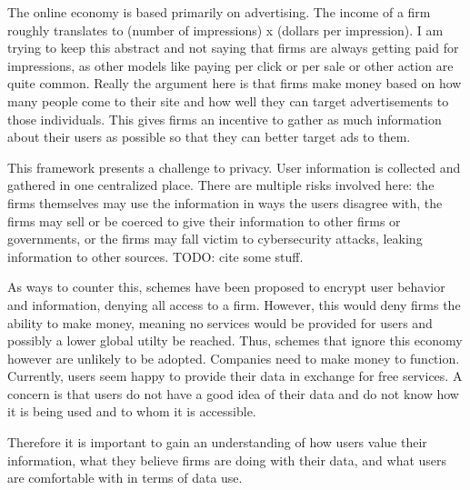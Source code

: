 
The online economy is based primarily on advertising.
The income of a firm roughly translates to (number of impressions) x (dollars per impression).
I am trying to keep this abstract and not saying that firms are always getting paid for impressions, as other models like paying per click or per sale or other action are quite common.
Really the argument here is that firms make money based on how many people come to their site and how well they can target advertisements to those individuals.
This gives firms an incentive to gather as much information about their users as possible so that they can better target ads to them.

This framework presents a challenge to privacy.
User information is collected and gathered in one centralized place.
There are multiple risks involved here: the firms themselves may use the information in ways the users disagree with, the firms may sell or be coerced to give their information to other firms or governments, or the firms may fall victim to cybersecurity attacks, leaking information to other sources.
TODO: cite some stuff.

As ways to counter this, schemes have been proposed to encrypt user behavior and information, denying all access to a firm.
However, this would deny firms the ability to make money, meaning no services would be provided for users and possibly a lower global utilty be reached.
Thus, schemes that ignore this economy however are unlikely to be adopted.
Companies need to make money to function.
Currently, users seem happy to provide their data in exchange for free services.
A concern is that users do not have a good idea of their data and do not know how it is being used and to whom it is accessible.

Therefore it is important to gain an understanding of how users value their information, what they believe firms are doing with their data, and what users are comfortable with in terms of data use.






